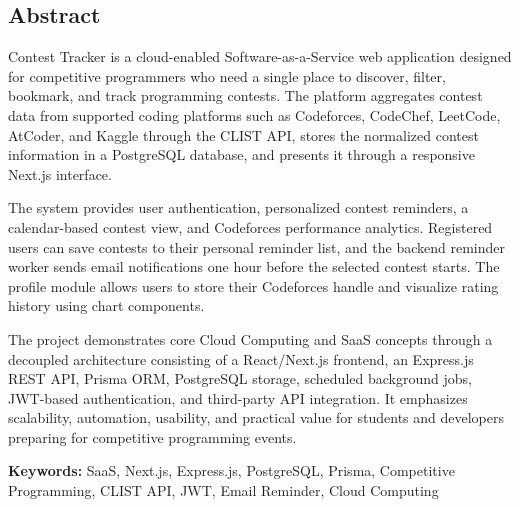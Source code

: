 \documentclass[12pt,a4paper]{report}
\begin{document}
\newpage
\pagestyle{plain}
\begin{center}
    \begin{LARGE}
        \section*{Abstract}
    \end{LARGE}
\end{center}
\vspace{0.5cm}

{\normalsize
\setlength{\baselineskip}{1.1\baselineskip}

\noindent
Contest Tracker is a cloud-enabled Software-as-a-Service web application designed for competitive programmers who need a single place to discover, filter, bookmark, and track programming contests. The platform aggregates contest data from supported coding platforms such as Codeforces, CodeChef, LeetCode, AtCoder, and Kaggle through the CLIST API, stores the normalized contest information in a PostgreSQL database, and presents it through a responsive Next.js interface.

\vspace{0.3cm}

\noindent
The system provides user authentication, personalized contest reminders, a calendar-based contest view, and Codeforces performance analytics. Registered users can save contests to their personal reminder list, and the backend reminder worker sends email notifications one hour before the selected contest starts. The profile module allows users to store their Codeforces handle and visualize rating history using chart components.

\vspace{0.3cm}

\noindent
The project demonstrates core Cloud Computing and SaaS concepts through a decoupled architecture consisting of a React/Next.js frontend, an Express.js REST API, Prisma ORM, PostgreSQL storage, scheduled background jobs, JWT-based authentication, and third-party API integration. It emphasizes scalability, automation, usability, and practical value for students and developers preparing for competitive programming events.

\vspace{0.6cm}

\noindent
\textbf{Keywords:} SaaS, Next.js, Express.js, PostgreSQL, Prisma, Competitive Programming, CLIST API, JWT, Email Reminder, Cloud Computing
}
\end{document}
